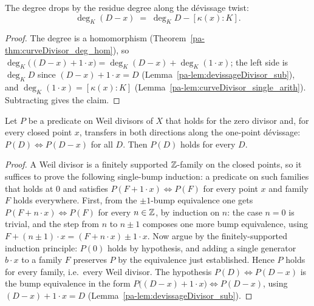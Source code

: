 \begin{lemma}
  \label{pa-lem:deg_devissageDivisor}
  \leanok

  The degree drops by the residue degree along the dévissage twist:
  \[
    \deg_K(D - x) \;=\; \deg_K D - [\kappa(x):K].
  \]
\end{lemma}
\begin{proof}
  \leanok
  The degree is a homomorphism (Theorem~\ref{pa-thm:curveDivisor_deg_hom}), so
  \(\deg_K\bigl((D - x) + 1\cdot x\bigr) = \deg_K(D - x) + \deg_K(1 \cdot x)\); the left side is
  \(\deg_K D\) since \((D - x) + 1 \cdot x = D\) (Lemma~\ref{pa-lem:devissageDivisor_sub}), and
  \(\deg_K(1 \cdot x) = [\kappa(x):K]\) (Lemma~\ref{pa-lem:curveDivisor_single_arith}). Subtracting
  gives the claim.
\end{proof}

\begin{theorem}
  \label{pa-thm:induction_devissage}
  \leanok

  Let \(P\) be a predicate on Weil divisors of \(X\) that holds for the zero divisor and, for
  every closed point \(x\), transfers in both directions along the one-point dévissage:
  \(P(D) \iff P(D - x)\) for all \(D\). Then \(P(D)\) holds for every \(D\).
\end{theorem}
\begin{proof}
  \leanok
  A Weil divisor is a finitely supported \(\mathbb{Z}\)-family on the closed points, so it suffices to
  prove the following single-bump induction: a predicate on such families that holds at \(0\) and
  satisfies \(P(F + 1 \cdot x) \iff P(F)\) for every point \(x\) and family \(F\) holds
  everywhere. First, from the \(\pm 1\)-bump equivalence one gets \(P(F + n \cdot x) \iff P(F)\)
  for every \(n \in \mathbb{Z}\), by induction on \(n\): the case \(n = 0\) is trivial, and the step
  from \(n\) to \(n \pm 1\) composes one more bump equivalence, using
  \(F + (n\pm 1)\cdot x = (F + n\cdot x) \pm 1\cdot x\). Now argue by the finitely-supported
  induction principle: \(P(0)\) holds by hypothesis, and adding a single generator \(b \cdot x\)
  to a family \(F\) preserves \(P\) by the equivalence just established. Hence \(P\) holds for
  every family, i.e.\ every Weil divisor. The hypothesis \(P(D) \iff P(D - x)\) is the bump
  equivalence in the form \(P\bigl((D - x) + 1\cdot x\bigr) \iff P(D - x)\), using
  \((D - x) + 1\cdot x = D\) (Lemma~\ref{pa-lem:devissageDivisor_sub}).
\end{proof}

